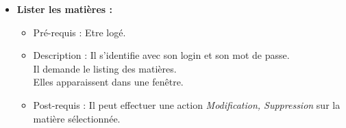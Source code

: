 \begin{itemize}
\item  {\bf Lister les mati{\`e}res :}
	\begin{itemize}
	\item Pr{\'e}-requis : Etre log{\'e}.
	\item Description : Il s'identifie avec son login et son mot de passe.\\
	Il demande le listing des mati{\`e}res.\\
	Elles apparaissent dans une fen{\^e}tre.
	\item Post-requis : Il peut effectuer une action {\it Modification, Suppression} sur la mati{\`e}re s{\'e}lectionn{\'e}e.\\
	\end{itemize}
\end{itemize}
